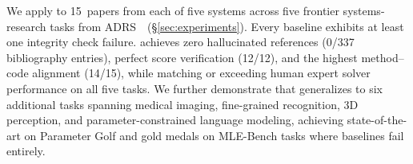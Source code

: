 We apply \coeaudit{} to 15~papers from each of five systems across five frontier systems-research tasks from ADRS~\citep{cheng2025barbarians,skydiscover2026}~(\S\ref{sec:experiments}).
Every baseline exhibits at least one integrity check failure.
\sys{} achieves zero hallucinated references (0/337 bibliography entries), perfect score verification (12/12), and the highest method--code alignment (14/15), while matching or exceeding human expert solver performance on all five tasks.
We further demonstrate that \sys{} generalizes to six additional tasks spanning medical imaging, fine-grained recognition, 3D perception, and parameter-constrained language modeling, achieving state-of-the-art on Parameter Golf and gold medals on MLE-Bench tasks where baselines fail entirely.